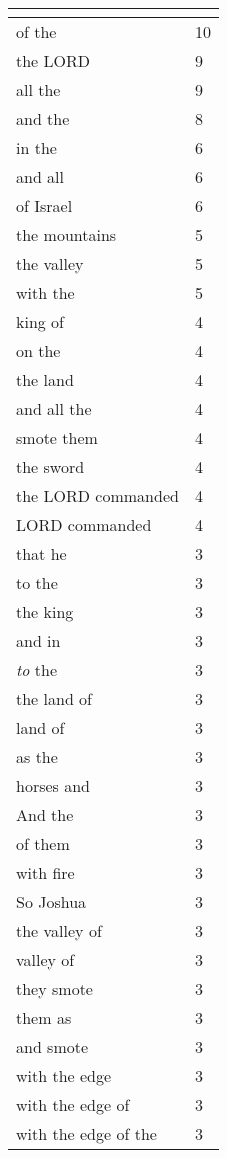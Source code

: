 \begin{center}
\begin{longtable}{|p{3.0in}|p{0.5in}|}
\hline \multicolumn{2}{c}{{ }} \\ \hline
\endfoot 
of the & 10\\ \hline 
the LORD & 9\\ \hline 
all the & 9\\ \hline 
and the & 8\\ \hline 
in the & 6\\ \hline 
and all & 6\\ \hline 
of Israel & 6\\ \hline 
the mountains & 5\\ \hline 
the valley & 5\\ \hline 
with the & 5\\ \hline 
king of & 4\\ \hline 
on the & 4\\ \hline 
the land & 4\\ \hline 
and all the & 4\\ \hline 
smote them & 4\\ \hline 
the sword & 4\\ \hline 
the LORD commanded & 4\\ \hline 
LORD commanded & 4\\ \hline 
that he & 3\\ \hline 
to the & 3\\ \hline 
the king & 3\\ \hline 
and in & 3\\ \hline 
\emph{to} the & 3\\ \hline 
the land of & 3\\ \hline 
land of & 3\\ \hline 
as the & 3\\ \hline 
horses and & 3\\ \hline 
And the & 3\\ \hline 
of them & 3\\ \hline 
with fire & 3\\ \hline 
So Joshua & 3\\ \hline 
the valley of & 3\\ \hline 
valley of & 3\\ \hline 
they smote & 3\\ \hline 
them as & 3\\ \hline 
and smote & 3\\ \hline 
with the edge & 3\\ \hline 
with the edge of & 3\\ \hline 
with the edge of the & 3\\ \hline 

\end{longtable}
\end{center}
